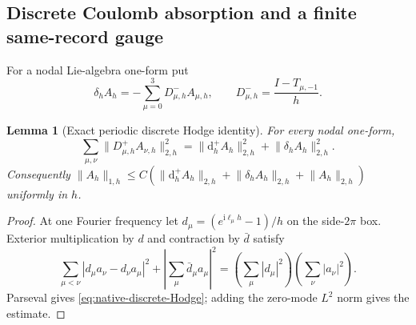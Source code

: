 \documentclass[11pt]{article}
\numberwithin{equation}{section}
\newtheorem{lemma}[lemma]{Lemma}
\theoremstyle{definition}
\theoremstyle{remark}
\newcommand{\dd}{\mathrm d}
\newcommand{\ii}{\mathrm i}
\newcommand{\norm}[1]{\lVert#1\rVert}
\begin{document}
\subsection{Discrete Coulomb absorption and a finite same-record gauge}

For a nodal Lie-algebra one-form put
\begin{equation}
 \delta_hA_h=-\sum_{\mu=0}^3D^-_{\mu,h}A_{\mu,h},
 \qquad
 D^-_{\mu,h}=\frac{I-T_{\mu,-1}}h.
 \label{eq:native-discrete-divergence}
\end{equation}

\begin{lemma}[Exact periodic discrete Hodge identity]
\label{lem:native-discrete-Hodge}
For every nodal one-form,
\begin{equation}
 \sum_{\mu,\nu}\norm{D^+_{\mu,h}A_{\nu,h}}_{2,h}^2
 =\norm{\dd_h^+A_h}_{2,h}^2+\norm{\delta_hA_h}_{2,h}^2.
 \label{eq:native-discrete-Hodge}
\end{equation}
Consequently
$\norm{A_h}_{1,h}\le C(\norm{\dd_h^+A_h}_{2,h}
+\norm{\delta_hA_h}_{2,h}+\norm{A_h}_{2,h})$ uniformly in $h$.
\end{lemma}
\begin{proof}
At one Fourier frequency let
$d_\mu=(e^{\ii\ell_\mu h}-1)/h$ on the side-$2\pi$ box.  Exterior multiplication by $d$ and
contraction by $\bar d$ satisfy
\[
 \sum_{\mu<\nu}|d_\mu a_\nu-d_\nu a_\mu|^2
 +\left|\sum_\mu\bar d_\mu a_\mu\right|^2
 =\left(\sum_\mu|d_\mu|^2\right)\left(\sum_\nu|a_\nu|^2\right).
\]
Parseval gives \eqref{eq:native-discrete-Hodge}; adding the zero-mode
$L^2$ norm gives the estimate.
\end{proof}
\end{document}
